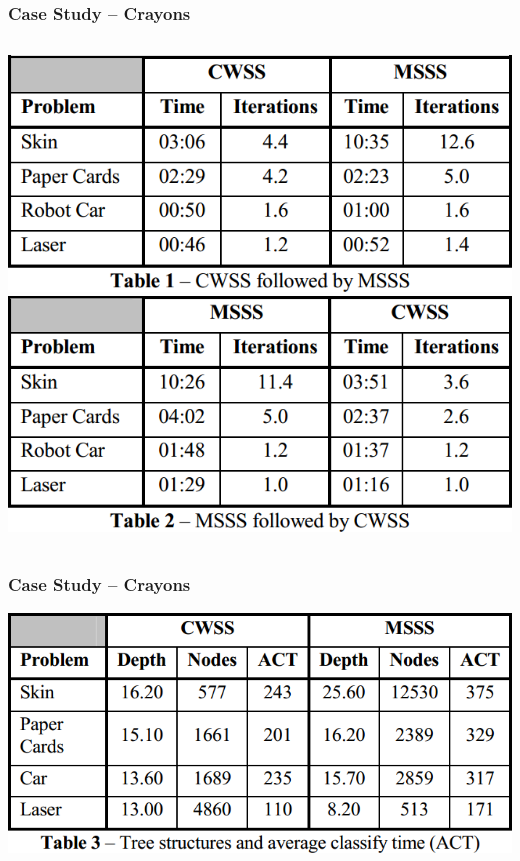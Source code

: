 \documentclass[xcolor=svgnames]{beamer}
\begin{document}
\begin{frame}
	\frametitle{Case Study -- Crayons}
	\begin{columns}
		\includegraphics[width=\textwidth]{2013-IA080-interactive-machine-learning/crayons-cwss-msss.png}
		\includegraphics[width=\textwidth]{2013-IA080-interactive-machine-learning/crayons-msss-cwss.png}
	\end{columns}
\end{frame}
\begin{frame}
	\frametitle{Case Study -- Crayons}
	\begin{center}
		\includegraphics[width=\textwidth]{2013-IA080-interactive-machine-learning/crayons-results.png}
	\end{center}
\end{frame}
\end{document}
